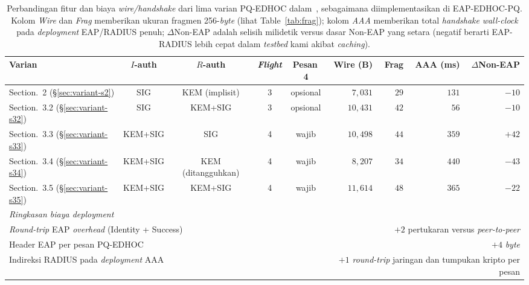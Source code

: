 \documentclass{easychair}
\newcommand{\VarSecShort}[1]{Section.~#1}
\begin{document}
\begin{table}[h]
\centering
\footnotesize
\caption{Perbandingan fitur dan biaya \emph{wire/handshake} dari
lima varian PQ-EDHOC dalam~\cite{pq-edhoc-draft}, sebagaimana
diimplementasikan di EAP-EDHOC-PQ. Kolom \emph{Wire} dan
\emph{Frag} memberikan ukuran fragmen 256-\emph{byte} (lihat
Table~\ref{tab:frag}); kolom \emph{AAA} memberikan total
\emph{handshake} \emph{wall-clock} pada \emph{deployment} EAP/RADIUS
penuh; $\Delta$Non-EAP adalah selisih milidetik versus dasar
Non-EAP yang setara (negatif berarti EAP-RADIUS lebih cepat dalam
\emph{testbed} kami akibat \emph{caching}).}
\label{tab:comparison}
\begin{tabular}{lccccrrrr}
\toprule
\textbf{Varian} & \textbf{$I$-auth} & \textbf{$R$-auth} & \textbf{\emph{Flight}} & \textbf{Pesan\,4} & \textbf{Wire (B)} & \textbf{Frag} & \textbf{AAA (ms)} & \textbf{$\Delta$Non-EAP} \\
\midrule
\VarSecShort{2}   (\S\ref{sec:variant-s2})  & SIG     & KEM (implisit)   & 3 & opsional & $7{,}031$  & $29$ & $131$ & $-10$ \\
\VarSecShort{3.2} (\S\ref{sec:variant-s32}) & SIG     & KEM+SIG          & 3 & opsional & $10{,}431$ & $42$ & $56$  & $-10$ \\
\VarSecShort{3.3} (\S\ref{sec:variant-s33}) & KEM+SIG & SIG              & 4 & wajib    & $10{,}498$ & $44$ & $359$ & $+42$ \\
\VarSecShort{3.4} (\S\ref{sec:variant-s34}) & KEM+SIG & KEM (ditangguhkan) & 4 & wajib  & $8{,}207$  & $34$ & $440$ & $-43$ \\
\VarSecShort{3.5} (\S\ref{sec:variant-s35}) & KEM+SIG & KEM+SIG          & 4 & wajib    & $11{,}614$ & $48$ & $365$ & $-22$ \\
\midrule
\multicolumn{9}{l}{\textit{Ringkasan biaya \emph{deployment}}} \\
\multicolumn{5}{l}{\emph{Round-trip} EAP \emph{overhead} (Identity + Success)} & \multicolumn{4}{r}{$+2$ pertukaran versus \emph{peer-to-peer}} \\
\multicolumn{5}{l}{Header EAP per pesan PQ-EDHOC} & \multicolumn{4}{r}{$+4$ \emph{byte}} \\
\multicolumn{5}{l}{Indireksi RADIUS pada \emph{deployment} AAA} & \multicolumn{4}{r}{$+1$ \emph{round-trip} jaringan dan tumpukan kripto per pesan} \\
\bottomrule
\end{tabular}
\end{table}


\end{document}
